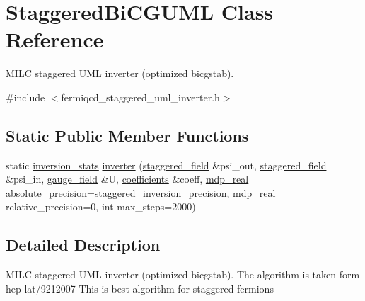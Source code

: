 \hypertarget{class_staggered_bi_c_g_u_m_l}{
\section{StaggeredBiCGUML Class Reference}
\label{class_staggered_bi_c_g_u_m_l}
}


MILC staggered UML inverter (optimized bicgstab).  


{\ttfamily \#include $<$fermiqcd\_\-staggered\_\-uml\_\-inverter.h$>$}\subsection*{Static Public Member Functions}
\begin{DoxyCompactItemize}
\item 
static \hyperlink{classinversion__stats}{inversion\_\-stats} \hyperlink{class_staggered_bi_c_g_u_m_l_ac1959ada50857a518ad4c9d82fead805}{inverter} (\hyperlink{classstaggered__field}{staggered\_\-field} \&psi\_\-out, \hyperlink{classstaggered__field}{staggered\_\-field} \&psi\_\-in, \hyperlink{classgauge__field}{gauge\_\-field} \&U, \hyperlink{classcoefficients}{coefficients} \&coeff, \hyperlink{mdp__global__vars_8h_a049e4c1d4e74d644878a42f9909463e4}{mdp\_\-real} absolute\_\-precision=\hyperlink{fermiqcd__default__parameters_8h_ace2adee73e3f9d7c0df3759732b2688b}{staggered\_\-inversion\_\-precision}, \hyperlink{mdp__global__vars_8h_a049e4c1d4e74d644878a42f9909463e4}{mdp\_\-real} relative\_\-precision=0, int max\_\-steps=2000)
\end{DoxyCompactItemize}


\subsection{Detailed Description}
MILC staggered UML inverter (optimized bicgstab). The algorithm is taken form hep-\/lat/9212007 This is best algorithm for staggered fermions

